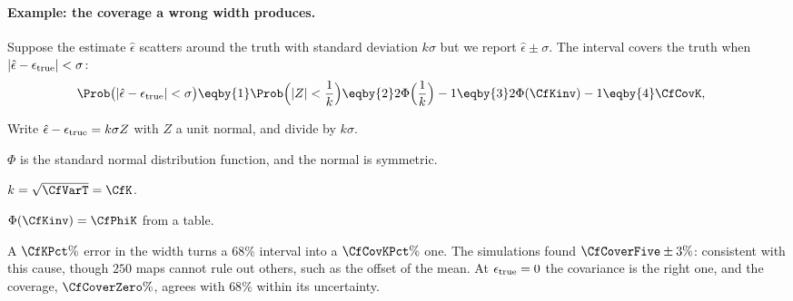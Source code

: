 \paragraph{Example: the coverage a wrong width produces.} Suppose the estimate $\hat\epsilon$ scatters around the truth with standard
deviation $k\sigma$ but we report $\hat\epsilon\pm\sigma$. The interval covers the truth when $|\hat\epsilon-\epsilon_{\rm true}|<\sigma$:
\begin{align}
  \Prob\bigl(|\hat\epsilon-\epsilon_{\rm true}|<\sigma\bigr)
  &\eqby{1}\Prob\Bigl(|Z|<\frac1k\Bigr)
   \eqby{2}2\Phi\Bigl(\frac1k\Bigr)-1
   \eqby{3}2\Phi(\CfKinv)-1
   \eqby{4}\CfCovK ,
  \label{12c:eq:coverage-k}
\end{align}
\begin{explain}
  \item Write $\hat\epsilon-\epsilon_{\rm true}=k\sigma Z$ with $Z$ a unit normal, and divide by $k\sigma$.
  \item $\Phi$ is the standard normal distribution function, and the normal is symmetric.
  \item $k=\sqrt{\CfVarT}=\CfK$.
  \item $\Phi(\CfKinv)=\CfPhiK$ from a table.
\end{explain}
A $\CfKPct\%$ error in the width turns a $68\%$ interval into a $\CfCovKPct\%$ one. The simulations found $\CfCoverFive\pm3\%$:
consistent with this cause, though $250$ maps cannot rule out others, such as the offset of the mean. At $\epsilon_{\rm true}=0$
the covariance is the right one, and the coverage, $\CfCoverZero\%$, agrees with $68\%$ within its uncertainty.


